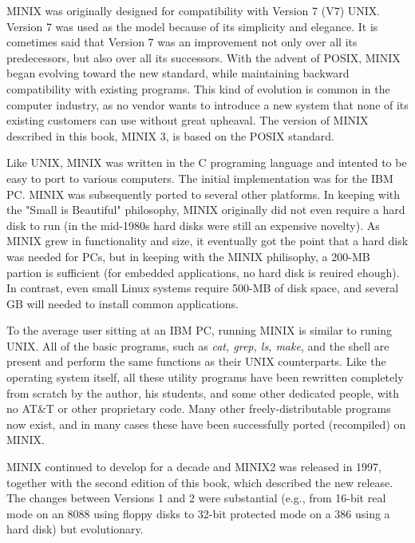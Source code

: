 \documentclass{book}
\newcommand {\sys} [1] {\textsl{#1}}
\begin{document}
MINIX was originally designed for compatibility with Version 7 (V7) UNIX. Version 7 was used as the model because of its simplicity and elegance.
It is cometimes said that Version 7 was an improvement not only over all its predecessors, but also over all its successors.
With the advent of POSIX, MINIX began evolving toward the new standard, while maintaining backward compatibility with existing programs.
This kind of evolution is common in the computer industry, as no vendor wants to introduce a new system 
that none of its existing customers can use without great upheaval.
The version of MINIX described in this book, MINIX 3, is based on the POSIX standard.

Like UNIX, MINIX was written in the C programing language and intented to be easy to port to various computers.
The initial implementation was for the IBM PC.
MINIX was subsequently ported to several other platforms.
In keeping with the "Small is Beautiful" philosophy, MINIX originally did not even require a hard disk to run 
(in the mid-1980s hard disks were still an expensive novelty).
As MINIX grew in functionality and size, it eventually got the point that a hard disk was needed for PCs,
but in keeping with the MINIX philisophy, a 200-MB partion is sufficient (for embedded applications, no hard disk is reuired ehough).
In contrast, even small Linux systems require 500-MB of disk space, and several GB will needed to install common applications.

To the average user sitting at an IBM PC, running MINIX is similar to runing UNIX.
All of the basic programs, such as \sys{cat, grep, ls, make}, and the shell are present and perform the same functions as their UNIX counterparts. 
Like the operating system itself, all these utility programs have been rewritten completely from scratch by the author, 
his students, and some other dedicated people, with no AT\&T or other proprietary code.
Many other freely-distributable programs now exist, and in many cases these have been successfully ported (recompiled) on MINIX.

MINIX continued to develop for a decade and MINIX2 was released in 1997, together with the second edition of this book, which described the new release.
The changes between Versions 1 and 2 were substantial (e.g., from 16-bit real mode on an 8088 using floppy disks 
to 32-bit protected mode on a 386 using a hard disk) but evolutionary.
\end{document}
